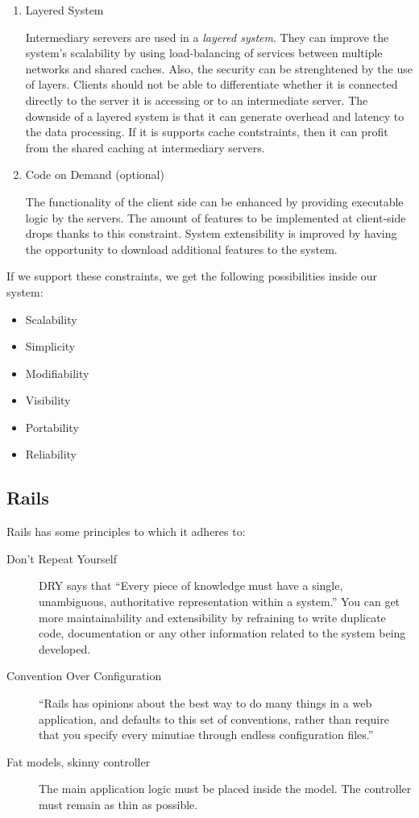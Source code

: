 \begin{enumerate}
  \item Layered System

    Intermediary serevers are used in a \textit{layered system}. They can improve the system's scalability by using load-balancing of services between multiple networks and shared caches. Also, the security can be strenghtened by the use of layers. Clients should not be able to differentiate whether it is connected directly to the server it is accessing or to an intermediate server.
    The downside of a layered system is that it can generate overhead and latency to the data processing. If it is supports cache contstraints, then it can profit from the shared caching at intermediary servers.

  \item Code on Demand (optional)

    The functionality of the client side can be enhanced by providing executable logic by the servers. The amount of features to be implemented at client-side drops thanks to this constraint. System extensibility is improved by having the opportunity to download additional features to the system.

\end{enumerate}

If we support these constraints, we get the following possibilities inside our system:
\begin{itemize} 
  \item Scalability
  \item Simplicity
  \item Modifiability
  \item Visibility
  \item Portability
  \item Reliability
\end{itemize}


\subsection{Rails}

Rails has some principles to which it adheres to:
\begin{description}

  \item[Don't Repeat Yourself] DRY says that ``Every piece of knowledge must have a single, unambiguous, authoritative representation within a system.'' \cite{dry_principle} You can get more maintainability and extensibility by refraining to write duplicate code, documentation or any other information related to the system being developed. 

  \item[Convention Over Configuration] ``Rails has opinions about the best way to do many things in a web application, and defaults to this set of conventions, rather than require that you specify every minutiae through endless configuration files.'' \cite{rails_principles}

  \item[Fat models, skinny controller] The main application logic must be placed inside the model. The controller must remain as thin as possible. 
\end{description}



